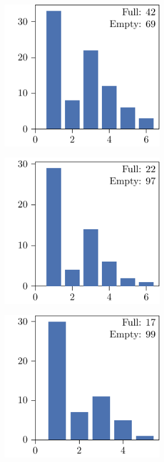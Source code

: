 \begin{figure}[p]
  \centering
  \begin{subfigure}{\textwidth}
    \centering
    \begin{subfigure}{\mymultiouter}
        \includegraphics[width=\mymultiinner]{figures/new/abs_common-diabetes-qlibra-permutation}
    \end{subfigure}
    \begin{subfigure}{\mymultiouter}
        \includegraphics[width=\mymultiinner]{figures/new/abs_common-diabetes-qlibra-retraining}
    \end{subfigure}
    \begin{subfigure}{\mymultiouter}
        \includegraphics[width=\mymultiinner]{figures/new/abs_common-diabetes-permutation-retraining}

\end{subfigure}
\end{subfigure}
\end{figure}
